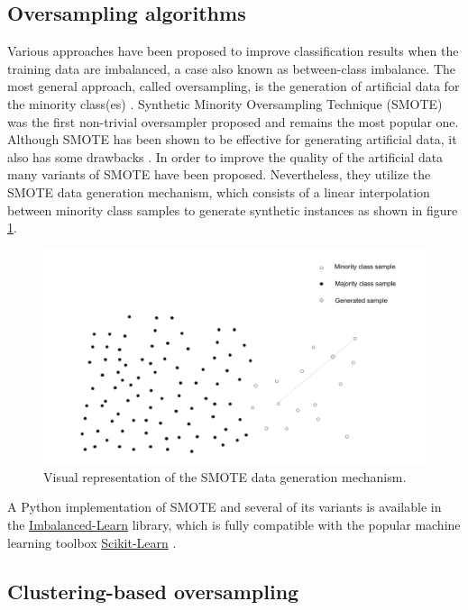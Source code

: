 \documentclass[preprint,12pt, a4paper]{elsarticle}
\begin{document}
\subsection{Oversampling algorithms}
\label{oversampling}

Various approaches have been proposed to improve classification results when the training data are imbalanced, a case also known as between-class imbalance. The most general approach, called oversampling, is the generation of artificial data for the minority class(es) \cite{Fernandez2013}. Synthetic Minority Oversampling Technique (SMOTE) \cite{Chawla2002} was the first non-trivial oversampler proposed and remains the most popular one. Although SMOTE has been shown to be effective for generating artificial data, it also has some drawbacks \cite{He2009}. In order to improve the quality of the artificial data many variants of SMOTE have been proposed. Nevertheless, they utilize the SMOTE data generation mechanism, which consists of a linear interpolation between minority class samples to generate synthetic instances as shown in figure \ref{fig:smote}.

\begin{figure}[H]
	\centering
	\includegraphics[width=1\linewidth]{../analysis/smote}
	\caption{Visual representation of the SMOTE data generation mechanism.}
	\label{fig:smote}
\end{figure}

A Python implementation of SMOTE and several of its variants is available in the \href{https://imbalanced-learn.org/stable/}{Imbalanced-Learn} \cite{Lemaitre2016} library, which is fully compatible with the popular machine learning toolbox \href{https://scikit-learn.org/stable/}{Scikit-Learn} \cite{Pedregosa2011}.

\subsection{Clustering-based oversampling}
\label{clustering-based-oversampling}
\end{document}

